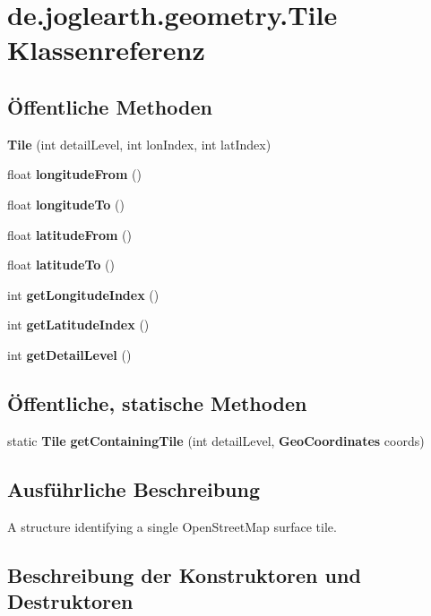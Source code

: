 \section{de.\-joglearth.\-geometry.\-Tile \-Klassenreferenz}
\label{classde_1_1joglearth_1_1geometry_1_1_tile}
\subsection*{Öffentliche \-Methoden}
\begin{DoxyCompactItemize}
\item 
{\bf \-Tile} (int detail\-Level, int lon\-Index, int lat\-Index)
\item 
float {\bf longitude\-From} ()
\item 
float {\bf longitude\-To} ()
\item 
float {\bf latitude\-From} ()
\item 
float {\bf latitude\-To} ()
\item 
int {\bf get\-Longitude\-Index} ()
\item 
int {\bf get\-Latitude\-Index} ()
\item 
int {\bf get\-Detail\-Level} ()
\end{DoxyCompactItemize}
\subsection*{Öffentliche, statische \-Methoden}
\begin{DoxyCompactItemize}
\item 
static {\bf \-Tile} {\bf get\-Containing\-Tile} (int detail\-Level, {\bf \-Geo\-Coordinates} coords)
\end{DoxyCompactItemize}


\subsection{\-Ausführliche \-Beschreibung}
\-A structure identifying a single \-Open\-Street\-Map surface tile. 

\subsection{\-Beschreibung der \-Konstruktoren und \-Destruktoren}

